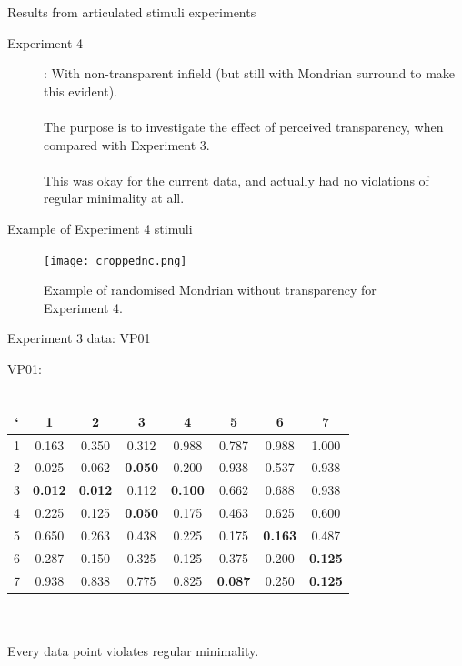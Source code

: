 \documentclass{beamer}
\begin{document}
\begin{frame}[t]{Results from articulated stimuli experiments}
\begin{description}
\item[Experiment 4]:  With non-transparent infield (but still with Mondrian surround to make this evident).\\
~\\

The purpose is to investigate the effect of perceived transparency, when compared with Experiment 3.\\
~\\
 This was okay for the current data, and actually had no violations of regular minimality at all.

\end{description}
\end{frame}

\begin{frame}[t]{Example of Experiment 4 stimuli}
\begin{figure}[c]
\texttt{[image: croppednc.png]}
\caption{Example of randomised Mondrian without transparency for Experiment 4.}
\end{figure}
\end{frame}

\begin{frame}[t]{Experiment 3 data: VP01}

VP01:\\
~\\
\begin{tabular}{c | c c c c c c c}
` & 1 & 2 & 3 & 4 & 5 & 6 & 7 \\ \hline

1 & {\color{red} 0.163} & 0.350 & 0.312 & 0.988 & 0.787 & 0.988 & 1.000\\

2 & {\color{red} 0.025} & 0.062 &{\bf 0.050}& 0.200 & 0.938 & 0.537 & 0.938\\

3 & {\bf \color{red} 0.012} & {\bf \color{red} 0.012} & 0.112 & {\bf 0.100} & 0.662 & 0.688 & 0.938\\

4 & 0.225 & 0.125 & {\bf \color{red} 0.050} & 0.175 & 0.463 & 0.625 & 0.600\\

5 & 0.650 & 0.263 & 0.438 & 0.225 & 0.175 & {\bf \color{red} 0.163} & 0.487\\

6 & 0.287 & 0.150 & 0.325 & {\color{red} 0.125} & 0.375 & 0.200 & {\bf \color{red} 0.125}\\

7 & 0.938 & 0.838 & 0.775 & 0.825 & {\bf \color{red} 0.087} & 0.250 & {\bf 0.125}\\

\end{tabular}
\\
~\\
Every data point violates regular minimality.
\end{frame}
\end{document}
